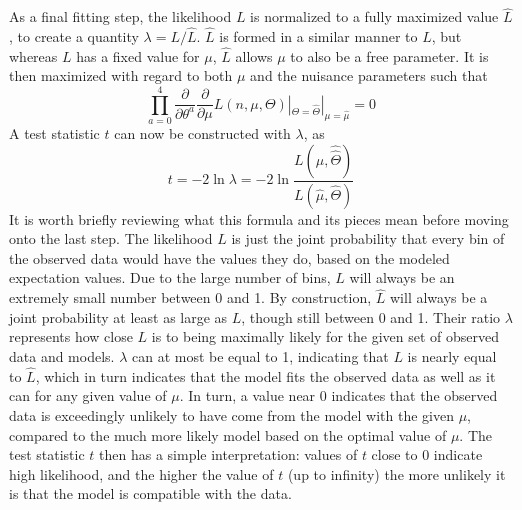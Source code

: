     As a final fitting step, the likelihood $L$ is normalized to a fully maximized value $\hat L$,
        to create a quantity $\lambda = L / \hat L$.
    $\hat L$ is formed in a similar manner to $L$, but whereas $L$ has a fixed value for $\mu$,
        $\hat L$ allows $\mu$ to also be a free parameter.
    It is then maximized with regard to both $\mu$ and the nuisance parameters such that
    \begin{equation}
        \prod \limits_{a=0}^{4} \frac{\partial}{\partial \theta^a} \frac{\partial}{\partial \mu} L(n,\mu,\Theta) |_{\Theta=\hat \Theta} |_{\mu=\hat \mu} = 0
    \end{equation}
    A test statistic $t$ can now be constructed with $\lambda$, as
    \begin{equation}
        t = -2 \ln{\lambda} = -2 \ln{\frac{L(\mu, \hat {\hat \Theta})}{L(\hat \mu, \hat \Theta)}}
    \end{equation}
    It is worth briefly reviewing what this formula and its pieces mean before moving onto the last step.
    The likelihood $L$ is just the joint probability that every bin of the observed data would have the values they do,
        based on the modeled expectation values.
    Due to the large number of bins, $L$ will always be an extremely small number between 0 and 1.
    By construction, $\hat L$ will always be a joint probability at least as large as $L$, though still between 0 and 1.
    Their ratio $\lambda$ represents how close $L$ is to being maximally likely for the given set of observed data and models.
    $\lambda$ can at most be equal to 1, indicating that $L$ is nearly equal to $\hat L$,
        which in turn indicates that the model fits the observed data as well as it can for any given value of $\mu$.
    In turn, a value near 0 indicates that the observed data is exceedingly unlikely to have come from the model with the given $\mu$,
        compared to the much more likely model based on the optimal value of $\mu$.
    The test statistic $t$ then has a simple interpretation:
        values of $t$ close to 0 indicate high likelihood,
        and the higher the value of $t$ (up to infinity) the more unlikely it is that the model is compatible with the data.

